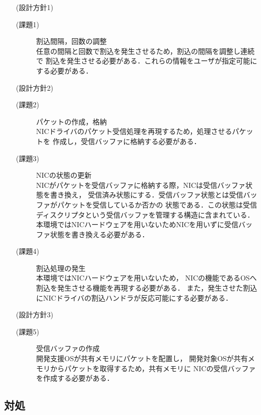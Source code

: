\documentclass[submit,techreq,noauthor,dvipdfmx]{ipsj}
\begin{document}
\begin{itemize}
    \item[(設計方針1)]\mbox{}
        \begin{description}
            \item[(課題1)] 割込間隔，回数の調整\\
                任意の間隔と回数で割込を発生させるため，割込の間隔を調整し連続で
                割込を発生させる必要がある．これらの情報をユーザが指定可能にする必要がある．
        \end{description}
    \item[(設計方針2)]\mbox{}
        \begin{description}
            \item[(課題2)] パケットの作成，格納\\
                NICドライバのパケット受信処理を再現するため，処理させるパケットを
                作成し，受信バッファに格納する必要がある．
            \item[(課題3)] NICの状態の更新\\
                NICがパケットを受信バッファに格納する際，NICは受信バッファ状態を書き換え，
                受信済み状態にする．受信バッファ状態とは受信バッファがパケットを受信しているか否かの
                状態である．この状態は受信ディスクリプタという受信バッファを管理する構造に含まれている．
                本環境ではNICハードウェアを用いないためNICを用いずに受信バッファ状態を書き換える必要がある．
            \item[(課題4)] 割込処理の発生\\
                本環境ではNICハードウェアを用いないため，
                NICの機能であるOSへ割込を発生させる機能を再現する必要がある．
                また，発生させた割込にNICドライバの割込ハンドラが反応可能にする必要がある．
        \end{description}
    \item[(設計方針3)]\mbox{}
        \begin{description}
            \item[(課題5)] 受信バッファの作成\\
                開発支援OSが共有メモリにパケットを配置し，
                開発対象OSが共有メモリからパケットを取得するため，共有メモリに
                NICの受信バッファを作成する必要がある．
        \end{description}
\end{itemize}

\subsection{対処}\label{sec:deal}
\end{document}
